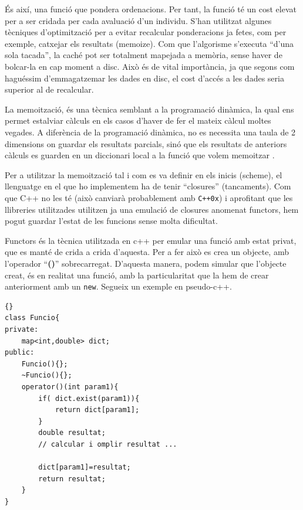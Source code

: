 
És així, una funció que pondera ordenacions.  Per tant, la funció té un cost
elevat per a ser cridada per cada avaluació d'un individu.  S'han utilitzat
algunes tècniques d'optimització per a evitar recalcular ponderacions ja fetes,
com per exemple, catxejar els resultats (memoize).  Com que l'algorisme
s'executa ``d'una sola tacada'', la caché pot ser totalment mapejada a memòria,
sense haver de bolcar-la en cap moment a disc.  Això és de vital importància, ja
que segons com haguéssim d'emmagatzemar les dades en disc, el cost d'accés a les
dades seria superior al de recalcular. 

La memoització, és una tècnica semblant a la programació dinàmica, la qual ens
permet estalviar càlculs en els casos d'haver de fer el mateix càlcul moltes
vegades.  A diferència de la programació dinàmica, no es necessita una taula de
2 dimensions on guardar els resultats parcials, sinó que els resultats de
anteriors càlculs es guarden en un diccionari local a la funció que volem
memoitzar \cite{MJD05}. 

Per a utilitzar la memoització tal i com es va definir en els inicis
(scheme), el llenguatge en el que ho implementem ha de tenir ``closures''
(tancaments).  Com que C++ no les té (això canviarà probablement amb
\texttt{C++0x}) %
i aprofitant que les llibreries utilitzades utilitzen ja una emulació de
closures anomenat functors, hem pogut guardar l'estat de les funcions sense
molta dificultat. 

Functors és la tècnica utilitzada en c++ per emular una funció amb estat privat,
que es manté de crida a crida d'aquesta.  Per a fer això es crea un objecte, amb
l'operador ``\textbf{()}'' sobrecarregat.  D'aquesta manera, podem simular que l'objecte
creat, és en realitat una funció, amb la particularitat que la hem de crear
anteriorment amb un \texttt{new}.  Segueix un exemple en pseudo-c++.


\lstset{language=c++,
	tabsize=2}
\lstset{commentstyle=\textit}

\begin{lstlisting}[frame=trbl]{}
class Funcio{
private:
	map<int,double> dict;
public:
	Funcio(){};
	~Funcio(){};
	operator()(int param1){
		if( dict.exist(param1)){
			return dict[param1];
		}
		double resultat;
		// calcular i omplir resultat ...

		dict[param1]=resultat;
		return resultat;
	}
}
\end{lstlisting}



